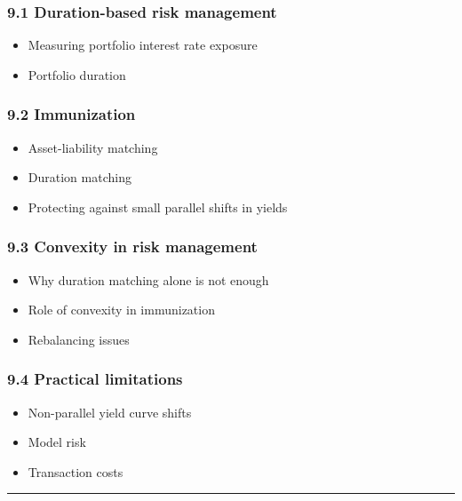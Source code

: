\documentclass[
  letterpaper,
  DIV=11,
  numbers=noendperiod]{scrartcl}
\providecommand{\tightlist}{%
  \setlength{\itemsep}{0pt}\setlength{\parskip}{0pt}}
\begin{document}
\subsubsection{9.1 Duration-based risk
management}\label{duration-based-risk-management}

\begin{itemize}
\tightlist
\item
  Measuring portfolio interest rate exposure
\item
  Portfolio duration
\end{itemize}

\subsubsection{9.2 Immunization}\label{immunization}

\begin{itemize}
\tightlist
\item
  Asset-liability matching
\item
  Duration matching
\item
  Protecting against small parallel shifts in yields
\end{itemize}

\subsubsection{9.3 Convexity in risk
management}\label{convexity-in-risk-management}

\begin{itemize}
\tightlist
\item
  Why duration matching alone is not enough
\item
  Role of convexity in immunization
\item
  Rebalancing issues
\end{itemize}

\subsubsection{9.4 Practical limitations}\label{practical-limitations}

\begin{itemize}
\tightlist
\item
  Non-parallel yield curve shifts
\item
  Model risk
\item
  Transaction costs
\end{itemize}

\begin{center}\rule{0.5\linewidth}{0.5pt}\end{center}
\end{document}
